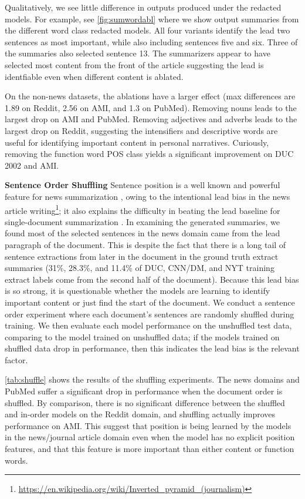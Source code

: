 Qualitatively, we see little difference in outputs produced under the redacted
models.  For example, see \autoref{fig:sumwordabl} where we show output
summaries from the different word class redacted models. All four variants
identify the lead two sentences as most important, while also including
sentences five and six. Three of the summaries also selected sentence 13.  The
summarizers appear to have selected most content from the front of the article
suggesting the lead is identfiable even when different content is ablated.



On the non-news datasets, the ablations have a larger effect (max differences
are 1.89 on Reddit, 2.56 on AMI, and 1.3 on PubMed).  Removing nouns leads to
the largest drop on AMI and PubMed.  Removing adjectives and adverbs leads to
the largest drop on Reddit, suggesting the intensifiers and descriptive words
are useful for identifying important content in personal narratives.
Curiously, removing the function word POS class yields a significant
improvement on DUC 2002 and AMI.



\textbf{Sentence Order Shuffling} Sentence position is a well known and
powerful feature for news summarization \citep{hong2014improving}, owing to the
intentional lead bias in the news article
writing\footnote{\url{https://en.wikipedia.org/wiki/Inverted_pyramid_(journalism)}};
it also explains the difficulty in beating the lead baseline for
single-document summarization \citep{nenkova2005b,brandow1995}.  In examining
the generated summaries, we found most of the selected sentences in the news
domain came from the lead paragraph of the document. This is despite the fact
that there is a long tail of sentence extractions from later in the document in
the ground truth extract summaries (31\%, 28.3\%, and 11.4\% of DUC, CNN/DM,
and NYT training extract labels come from the second half of the document).
Because this lead bias is so strong, it is questionable whether the models are
learning to identify important content or just find the start of the document.
We conduct a sentence order experiment where each document's sentences are
randomly shuffled during training. We then evaluate each model performance on
the unshuffled test data, comparing to the model trained on unshuffled data; if
the models trained on shuffled data drop in performance, then this indicates
the lead bias is the relevant factor.

\autoref{tab:shuffle} shows the results of the shuffling experiments.  The news
domains and PubMed suffer a significant drop in performance when the document
order is shuffled. By comparison, there is no significant difference between
the shuffled and in-order models on the Reddit domain, and shuffling actually
improves performance on AMI.  This suggest that position is being learned by
the models in the news/journal article domain even when the model has no
explicit position features, and that this feature is more important than either
content or function words.

